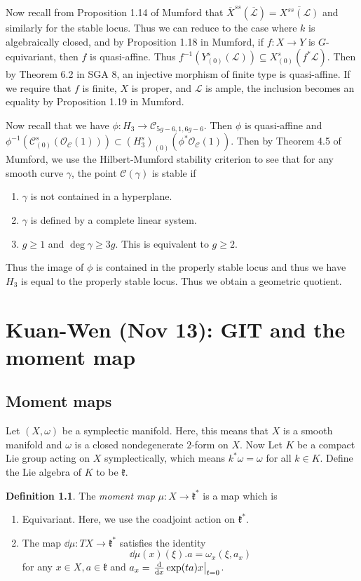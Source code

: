 \documentclass[leqno, openany]{memoir}
\theoremstyle{definition}
\newtheorem{defn}[thm]{Definition}
\theoremstyle{remark}
\theoremstyle{plain}
\theoremstyle{definition}
\theoremstyle{remark}
\newcommand{\mc}[1]{\mathcal{#1}}
\newcommand{\mf}[1]{\mathfrak{#1}}
\newcommand{\ol}[1]{\overline{#1}}
\begin{document}
Now recall from Proposition 1.14 of Mumford that $\ol{X}^{ss}(\ol{\mc{L}}) = \ol{X^{ss}(\mc{L})}$ and similarly for the stable locus. Thus we can reduce to the case where $k$ is algebraically closed, and by Proposition 1.18 in Mumford, if $f \colon X \to Y$ is $G$-equivariant, then $f$ is quasi-affine. Thus $f^{-1}(Y_{(0)}^s(\mc{L})) \subseteq X_{(0)}^s(f^* \mc{L})$. Then by Theorem 6.2 in SGA 8, an injective morphism of finite type is quasi-affine. If we require that $f$ is finite, $X$ is proper, and $\mc{L}$ is ample, the inclusion becomes an equality by Proposition 1.19 in Mumford.

Now recall that we have $\phi \colon H_3 \to \mc{C}_{5g-6, 1, 6g-6}$. Then $\phi$ is quasi-affine and $\phi^{-1}(\mc{C}_{(0)}^s ( \mc{O}_{\mc{C}}(1) )) \subset (H_3^s)_{(0)}(\phi^* \mc{O}_{\mc{C}}(1))$. Then by Theorem 4.5 of Mumford, we use the Hilbert-Mumford stability criterion to see that for any smooth curve $\gamma$, the point $\mc{C}(\gamma)$ is stable if
\begin{enumerate}
    \item $\gamma$ is not contained in a hyperplane.
    \item $\gamma$ is defined by a complete linear system.
    \item $g \geq 1$ and $\deg \gamma \geq 3g$. This is equivalent to $g \geq 2$.
\end{enumerate}
Thus the image of $\phi$ is contained in the properly stable locus and thus we have $H_3$ is equal to the properly stable locus. Thus we obtain a geometric quotient.

\chapter{Kuan-Wen (Nov 13): GIT and the moment map}%
\label{cha:kuan_wen_nov_13_git_and_the_moment_map}

\section{Moment maps}%
\label{sec:moment_maps}

Let $(X, \omega)$ be a symplectic manifold. Here, this means that $X$ is a smooth manifold and $\omega$ is a closed nondegenerate $2$-form on $X$. Now Let $K$ be a compact Lie group acting on $X$ symplectically, which means $k^* \omega = \omega$ for all $k \in K$. Define the Lie algebra of $K$ to be $\mf{k}$.

\begin{defn}
    The \textit{moment map} $\mu \colon X \to \mf{k}^*$ is a map which is
    \begin{enumerate}
        \item Equivariant. Here, we use the coadjoint action on $\mf{k}^*$.
        \item The map $\dd{\mu} \colon T X \to \mf{k}^*$ satisfies the identity
            \[ \dd{\mu}(x)(\xi) . a = \omega_x(\xi, a_x) \]
            for any $x \in X, a \in \mf{k}$ and $a_x = \eval{\dv{x} \exp(ta)x}_{t=0}$.
    \end{enumerate}
\end{defn}
\end{document}
